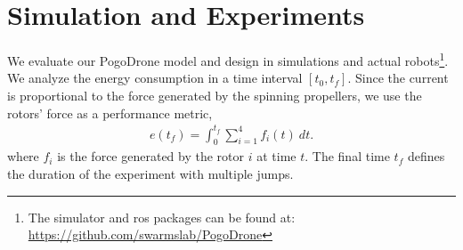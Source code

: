 \documentclass[letterpaper,10pt,conference]{ieeeconf}
\newcommand{\jiawei}[1]{{\color{purple}#1}}
\newcommand{\brian}[1]{{\color{brown}#1}}
\begin{document}




\section{Simulation and Experiments}
\noindent

We evaluate our PogoDrone model and design in simulations and actual robots\footnote{
        The simulator and ros packages can be found at: \url{https://github.com/swarmslab/PogoDrone}
    }.
We analyze the energy consumption  in a time interval $[t_0, t_f]$.
Since the current is proportional to the force generated by the spinning propellers, we use the rotors' force as a performance metric,
\begin{eqnarray}
e(t_f)= \int_{0}^{t_f} \sum_{i=1}^4 f_i(t) \: dt.
\label{eq:energy}
\end{eqnarray}
where $f_i$ is the force generated by the rotor $i$ at time $t$.
The final time $t_f$ defines the duration of the experiment with multiple jumps.


    
\end{document}

